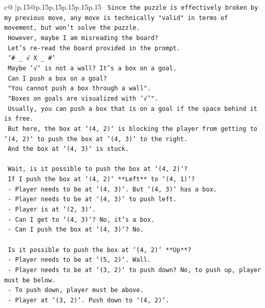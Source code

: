 \documentclass{article}
\begin{document}
{\begin{supertabular}{c@{$\;$}|p{.15\linewidth}@{}p{.15\linewidth}p{.15\linewidth}p{.15\linewidth}p{.15\linewidth}p{.15\linewidth}}
{{{\texttt{    Since the puzzle is effectively broken by my previous move, any move is technically "valid" in terms of movement, but won't solve the puzzle.} \\
\texttt{    However, maybe I am misreading the board?} \\
\texttt{    Let's re{-}read the board provided in the prompt.} \\
\texttt{    `\# \_ √ X \_ \#`} \\
\texttt{    Maybe `√` is not a wall? It's a box on a goal.} \\
\texttt{    Can I push a box on a goal?} \\
\texttt{    "You cannot push a box through a wall".} \\
\texttt{    "Boxes on goals are visualized with '√'".} \\
\texttt{    Usually, you can push a box that is on a goal if the space behind it is free.} \\
\texttt{    But here, the box at `(4, 2)` is blocking the player from getting to `(4, 2)` to push the box at `(4, 3)` to the right.} \\
\texttt{    And the box at `(4, 3)` is stuck.} \\
\\ 
\texttt{    Wait, is it possible to push the box at `(4, 2)`?} \\
\texttt{    If I push the box at `(4, 2)` **Left** to `(4, 1)`?} \\
\texttt{    {-} Player needs to be at `(4, 3)`. But `(4, 3)` has a box.} \\
\texttt{    {-} Player needs to be at `(4, 3)` to push left.} \\
\texttt{    {-} Player is at `(2, 3)`.} \\
\texttt{    {-} Can I get to `(4, 3)`? No, it's a box.} \\
\texttt{    {-} Can I push the box at `(4, 3)`? No.} \\
\\ 
\texttt{    Is it possible to push the box at `(4, 2)` **Up**?} \\
\texttt{    {-} Player needs to be at `(5, 2)`. Wall.} \\
\texttt{    {-} Player needs to be at `(3, 2)` to push down? No, to push up, player must be below.} \\
\texttt{    {-} To push down, player must be above.} \\
\texttt{    {-} Player at `(3, 2)`. Push down to `(4, 2)`.} \\
}}}
\end{supertabular}}
\end{document}
